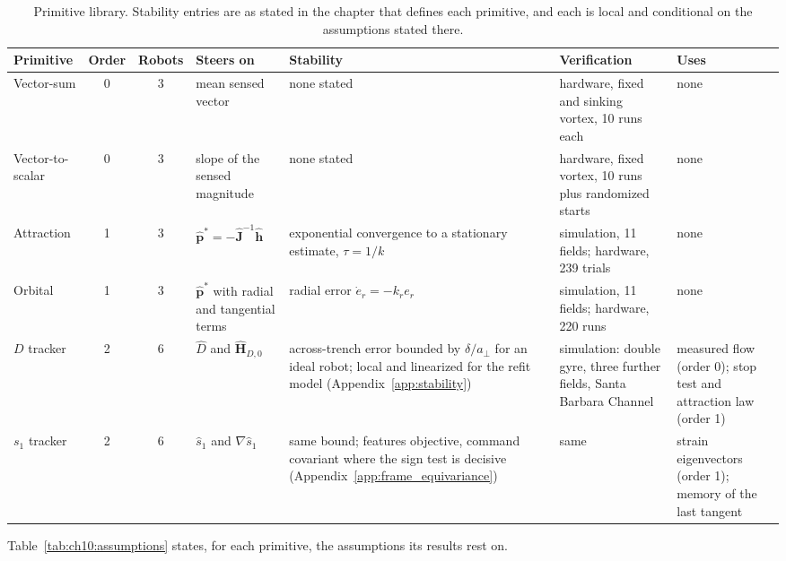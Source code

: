 \begin{table}[htbp]
\centering
\footnotesize
\caption{Primitive library. Stability entries are as stated in the
chapter that defines each primitive, and each is local and conditional on
the assumptions stated there.}
\label{tab:ch10:library}
\setlength{\tabcolsep}{3pt}
\begin{tabular}{>{\raggedright\arraybackslash}p{1.7cm} c c >{\raggedright\arraybackslash}p{2.3cm} >{\raggedright\arraybackslash}p{3.1cm} >{\raggedright\arraybackslash}p{2.9cm} >{\raggedright\arraybackslash}p{2.1cm}}
\hline
Primitive & Order & Robots & Steers on & Stability & Verification & Uses \\
\hline
Vector-sum & 0 & 3 & mean sensed vector & none stated & hardware, fixed and sinking vortex, 10 runs each & none \\
Vector-to-scalar & 0 & 3 & slope of the sensed magnitude & none stated & hardware, fixed vortex, 10 runs plus randomized starts & none \\
Attraction & 1 & 3 & $\hat{\mathbf{p}}^* = -\hat{\mathbf{J}}^{-1}\hat{\mathbf{h}}$ & exponential convergence to a stationary estimate, $\tau = 1/k$ & simulation, 11 fields; hardware, 239 trials & none \\
Orbital & 1 & 3 & $\hat{\mathbf{p}}^*$ with radial and tangential terms & radial error $\dot{e}_r = -k_r e_r$ & simulation, 11 fields; hardware, 220 runs & none \\
$D$ tracker & 2 & 6 & $\hat{D}$ and $\hat{\mathbf{H}}_{D,0}$ & across-trench error bounded by $\delta/a_\perp$ for an ideal robot; local and linearized for the refit model (Appendix~\ref{app:stability}) & simulation: double gyre, three further fields, Santa Barbara Channel & measured flow (order 0); stop test and attraction law (order 1) \\
$s_1$ tracker & 2 & 6 & $\hat{s}_1$ and $\nabla\hat{s}_1$ & same bound; features objective, command covariant where the sign test is decisive (Appendix~\ref{app:frame_equivariance}) & same & strain eigenvectors (order 1); memory of the last tangent \\
\hline
\end{tabular}
\end{table}

Table~\ref{tab:ch10:assumptions} states, for each primitive, the
assumptions its results rest on.

